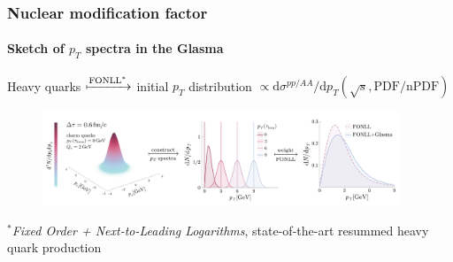 \documentclass[aspectratio=169,11pt,usenames,dvipsnames]{beamer}
\begin{document}
\begin{frame}
    \frametitle{Nuclear modification factor}
    \framesubtitle{Sketch of $p_T$ spectra in the Glasma}
    \begin{center}
    \vspace{0.6cm}
    Heavy quarks $\xmapsto{\text{FONLL}^*}$ initial $p_T$ distribution $\propto\mathrm{d}\sigma^{pp/AA}/\mathrm{d}p_T(\sqrt{s}, \mathrm{PDF/nPDF})$
    \\[0.2cm]
    \begin{figure}[!hbt]
        \centering
        \includegraphics[width=0.95\textwidth]{images/sketch_dndpt_v3.png}
    \end{figure}
    \end{center}
    \begin{center}
        \scriptsize $^*$\textit{Fixed Order + Next-to-Leading Logarithms}, state-of-the-art resummed heavy quark production
    \end{center}
\end{frame}
\end{document}
